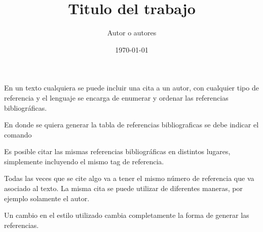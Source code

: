 \documentclass[
    a4paper,
    12pt
]{article}
\title{Titulo del trabajo}
\date{\today}
\author{Autor o autores}
\begin{document}
	\maketitle

    \tableofcontents

    En un texto cualquiera se puede incluir una cita a un autor\cite{ARTICLE:1}, con cualquier tipo de referencia\cite{DUMMY:1} y el lenguaje se encarga de enumerar y ordenar las referencias bibliográficas.
    
    En donde se quiera generar la tabla de referencias bibliograficas se debe indicar el comando
    
    Es posible citar las mismas referencias bibliográficas\cite{ARTICLE:1} en distintos lugares\cite{ARTICLE:1}, simplemente incluyendo el mismo tag de referencia\cite{ARTICLE:1}.
    
    Todas las veces que se cite algo\cite{DUMMY:1} va a tener el mismo número de referencia que va asociado al texto. La misma cita se puede utilizar de diferentes maneras, por ejemplo solamente el autor\autocite{DUMMY:1}.
    
    Un cambio en el estilo utilizado cambia completamente la forma de generar las referencias.
    
    
    \printbibliography
\end{document}
